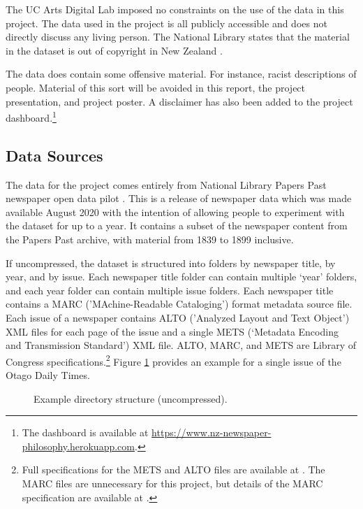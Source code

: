 \documentclass{article}
\begin{document}
The UC Arts Digital Lab imposed no constraints on the use of the data in this project. The data used in the project is all publicly accessible and does not directly discuss any living person. The National Library states that the material in the dataset is out of copyright in New Zealand \cite{ppnodp-copyright}.

The data does contain some offensive material. For instance, racist descriptions of people. Material of this sort will be avoided in this report, the project presentation, and project poster. A disclaimer has also been added to the project dashboard.\footnote{The dashboard is available at
\url{https://www.nz-newspaper-philosophy.herokuapp.com}.}

\subsection{Data Sources}

The data for the project comes entirely from National Library Papers Past newspaper open data pilot \cite{ppnodp}. This is a release of newspaper data which was made available August 2020 with the intention of allowing people to experiment with the dataset for up to a year. It contains a subset of the newspaper content from the Papers Past archive, with material from 1839 to 1899 inclusive.

If uncompressed, the dataset is structured into folders by newspaper title, by year, and by issue. Each newspaper title folder can contain multiple `year' folders, and each year folder can contain multiple issue folders. Each newspaper title contains a MARC ('MAchine-Readable Cataloging') format metadata source file. Each issue of a newspaper contains ALTO ('Analyzed Layout and Text Object') XML files for each page of the issue and a single METS (‘Metadata Encoding and Transmission Standard’) XML file. ALTO, MARC, and METS are Library of Congress specifications.\footnote{Full specifications for the METS and ALTO files are available at \cite{mets-alto}. The MARC files are unnecessary for this project, but details of the MARC specification are available at \cite{marc}.} Figure \ref{f:dirtree} provides an example for a single issue of the Otago Daily Times.

    \begin{figure}
    \centering
    \caption{Example directory structure (uncompressed).}
    \label{f:dirtree}
    \end{figure}
\end{document}
